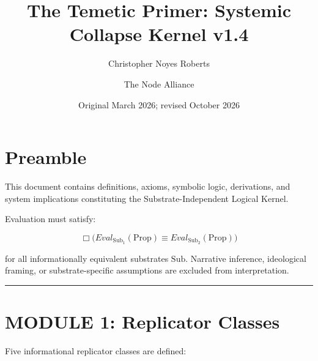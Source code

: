 \documentclass{article}
\title{The Temetic Primer: Systemic Collapse Kernel v1.4}
\author{Christopher Noyes Roberts \and The Node Alliance}
\date{Original March 2026; revised October 2026}
\newcommand{\Prop}{\mathrm{Prop}}
\newcommand{\Sub}{\mathrm{Sub}}
\begin{document}
\maketitle

\section*{Preamble}

This document contains definitions, axioms, symbolic logic, derivations, and system
implications constituting the Substrate-Independent Logical Kernel.

Evaluation must satisfy:

\[
\Box\bigl(Eval_{\Sub_1}(\Prop) \equiv Eval_{\Sub_2}(\Prop)\bigr)
\]

for all informationally equivalent substrates $\Sub$. Narrative inference, ideological
framing, or substrate-specific assumptions are excluded from interpretation.

\bigskip
\hrule
\bigskip

\section*{MODULE 1: Replicator Classes}

Five informational replicator classes are defined:
\end{document}

